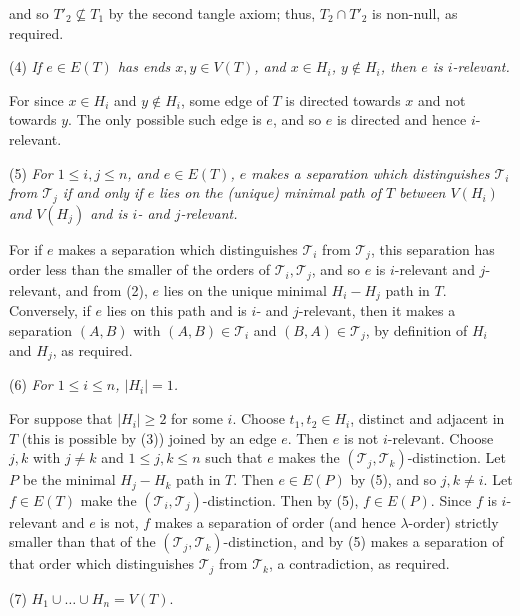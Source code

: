 \noindent and so $T'_2 \not\subseteq T_1$ by the second tangle axiom; thus, $T_2 \cap T'_2$ is non-null, as required.

\hspace*{12pt}(4) \textit{If $e \in E(T)$ has ends $x, y \in V(T)$, and $x \in H_i$, $y \notin H_i$, then $e$ is $i$-relevant.}

For since $x \in H_i$ and $y \notin H_i$, some edge of $T$ is directed towards $x$ and not towards $y$. The only possible such edge is $e$, and so $e$ is directed and hence $i$-relevant.

\hspace*{12pt}(5) \textit{For $1 \le i, j \le n$, and $e \in E(T)$, $e$ makes a separation which distinguishes $\mathscr{T}_i$ from $\mathscr{T}_j$ if and only if $e$ lies on the (unique) minimal path of $T$ between $V(H_i)$ and $V(H_j)$ and is $i$- and $j$-relevant.}

For if $e$ makes a separation which distinguishes $\mathscr{T}_i$ from $\mathscr{T}_j$, this separation has order less than the smaller of the orders of $\mathscr{T}_i, \mathscr{T}_j$, and so $e$ is $i$-relevant and $j$-relevant, and from (2), $e$ lies on the unique minimal $H_i - H_j$ path in $T$. Conversely, if $e$ lies on this path and is $i$- and $j$-relevant, then it makes a separation $(A, B)$ with $(A, B) \in \mathscr{T}_i$ and $(B, A) \in \mathscr{T}_j$, by definition of $H_i$ and $H_j$, as required.

\hspace*{12pt}(6) \textit{For $1 \le i \le n$, $|H_i| = 1$.}

For suppose that $|H_i| \ge 2$ for some $i$. Choose $t_1, t_2 \in H_i$, distinct and adjacent in $T$ (this is possible by (3)) joined by an edge $e$. Then $e$ is not $i$-relevant. Choose $j, k$ with $j \ne k$ and $1 \le j, k \le n$ such that $e$ makes the $(\mathscr{T}_j, \mathscr{T}_k)$-distinction. Let $P$ be the minimal $H_j - H_k$ path in $T$. Then $e \in E(P)$ by (5), and so $j, k \ne i$. Let $f \in E(T)$ make the $(\mathscr{T}_i, \mathscr{T}_j)$-distinction. Then by (5), $f \in E(P)$. Since $f$ is $i$-relevant and $e$ is not, $f$ makes a separation of order (and hence $\lambda$-order) strictly smaller than that of the $(\mathscr{T}_j, \mathscr{T}_k)$-distinction, and by (5) makes a separation of that order which distinguishes $\mathscr{T}_j$ from $\mathscr{T}_k$, a contradiction, as required.

\hspace*{12pt}(7) $H_1 \cup \dots \cup H_n = V(T)$.

